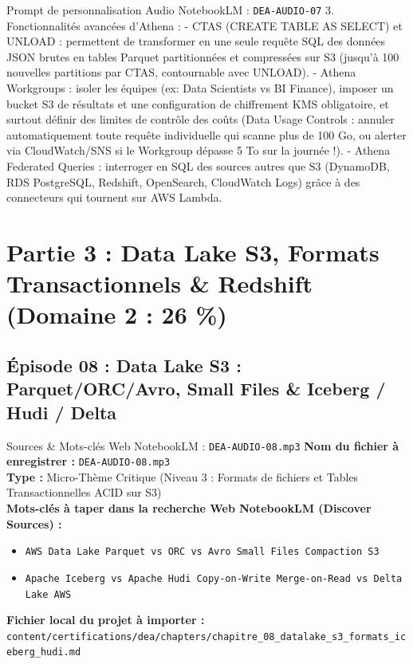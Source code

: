 \documentclass[11pt,a4paper]{article}
\begin{document}
\begin{promptbox}{Prompt de personnalisation Audio NotebookLM : \texttt{DEA-AUDIO-07}}
3. Fonctionnalités avancées d'Athena :
- CTAS (CREATE TABLE AS SELECT) et UNLOAD : permettent de transformer en une seule requête SQL des données JSON brutes en tables Parquet partitionnées et compressées sur S3 (jusqu'à 100 nouvelles partitions par CTAS, contournable avec UNLOAD).
- Athena Workgroups : isoler les équipes (ex: Data Scientists vs BI Finance), imposer un bucket S3 de résultats et une configuration de chiffrement KMS obligatoire, et surtout définir des limites de contrôle des coûts (Data Usage Controls : annuler automatiquement toute requête individuelle qui scanne plus de 100 Go, ou alerter via CloudWatch/SNS si le Workgroup dépasse 5 To sur la journée !).
- Athena Federated Queries : interroger en SQL des sources autres que S3 (DynamoDB, RDS PostgreSQL, Redshift, OpenSearch, CloudWatch Logs) grâce à des connecteurs qui tournent sur AWS Lambda.
\end{promptbox}

\newpage

\section{Partie 3 : Data Lake S3, Formats Transactionnels \& Redshift (Domaine 2 : 26 \%)}

\subsection{Épisode 08 : Data Lake S3 : Parquet/ORC/Avro, Small Files \& Iceberg / Hudi / Delta}
\begin{sourcebox}{Sources \& Mots-clés Web NotebookLM : \texttt{DEA-AUDIO-08.mp3}}
\textbf{Nom du fichier à enregistrer :} \texttt{DEA-AUDIO-08.mp3}\\
\textbf{Type :} Micro-Thème Critique (Niveau 3 : Formats de fichiers et Tables Transactionnelles ACID sur S3)\\
\textbf{Mots-clés à taper dans la recherche Web NotebookLM (Discover Sources) :}
\begin{itemize}[noitemsep]
    \item \texttt{AWS Data Lake Parquet vs ORC vs Avro Small Files Compaction S3}
    \item \texttt{Apache Iceberg vs Apache Hudi Copy-on-Write Merge-on-Read vs Delta Lake AWS}
\end{itemize}
\textbf{Fichier local du projet à importer :}
\texttt{content/certifications/dea/chapters/chapitre_08_datalake_s3_formats_iceberg_hudi.md}
\end{sourcebox}
\end{document}
